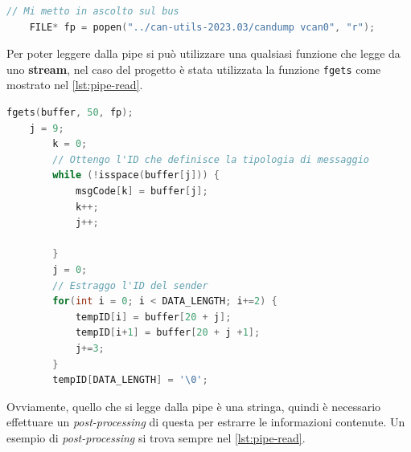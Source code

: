 \begin{lstlisting}[language=C, caption=Creazione di una pipe, label=lst:pipe-creation]
    // Mi metto in ascolto sul bus
    FILE* fp = popen("../can-utils-2023.03/candump vcan0", "r");
\end{lstlisting}

Per poter leggere dalla pipe si può utilizzare una qualsiasi funzione che legge da uno \textbf{stream}, nel caso del progetto è stata utilizzata la funzione \texttt{fgets} come mostrato nel \autoref{lst:pipe-read}.

\begin{lstlisting}[language=C, caption=Lettura dalla pipe, label=lst:pipe-read]
    fgets(buffer, 50, fp);
    j = 9;
        k = 0;
        // Ottengo l'ID che definisce la tipologia di messaggio
        while (!isspace(buffer[j])) {
            msgCode[k] = buffer[j];
            k++;
            j++;
            
        }
        j = 0;
        // Estraggo l'ID del sender
        for(int i = 0; i < DATA_LENGTH; i+=2) {
            tempID[i] = buffer[20 + j];
            tempID[i+1] = buffer[20 + j +1];
            j+=3;
        }
        tempID[DATA_LENGTH] = '\0';
\end{lstlisting}
Ovviamente, quello che si legge dalla pipe è una stringa, quindi è necessario effettuare un \emph{post-processing} di questa per estrarre le informazioni contenute. Un esempio di \emph{post-processing} si trova sempre nel \autoref{lst:pipe-read}.

